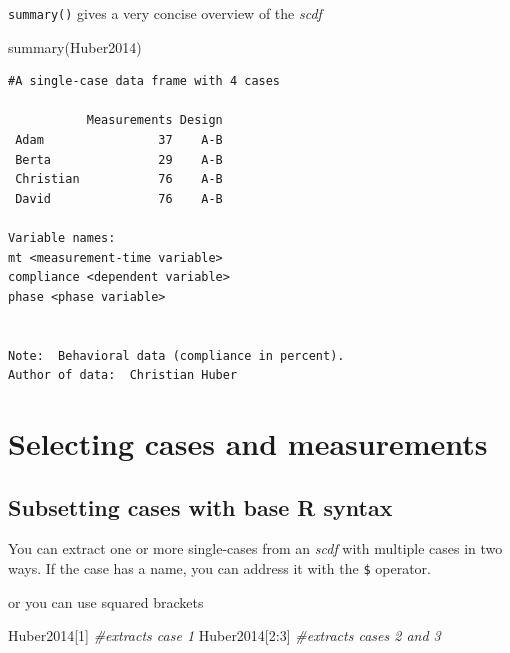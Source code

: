 \documentclass[
]{book}
\newenvironment{Shaded}{\begin{snugshade}}{\end{snugshade}}
\newcommand{\CommentTok}[1]{\textcolor[rgb]{0.56,0.35,0.01}{\textit{#1}}}
\newcommand{\DecValTok}[1]{\textcolor[rgb]{0.00,0.00,0.81}{#1}}
\newcommand{\FunctionTok}[1]{\textcolor[rgb]{0.00,0.00,0.00}{#1}}
\newcommand{\NormalTok}[1]{#1}
\newcommand{\SpecialCharTok}[1]{\textcolor[rgb]{0.00,0.00,0.00}{#1}}
\begin{document}
\texttt{summary()} gives a very concise overview of the \emph{scdf}

\begin{Shaded}
\begin{Highlighting}[]
\FunctionTok{summary}\NormalTok{(Huber2014)}
\end{Highlighting}
\end{Shaded}

\begin{verbatim}
#A single-case data frame with 4 cases

           Measurements Design
 Adam                37    A-B
 Berta               29    A-B
 Christian           76    A-B
 David               76    A-B

Variable names:
mt <measurement-time variable>
compliance <dependent variable>
phase <phase variable>


Note:  Behavioral data (compliance in percent).
Author of data:  Christian Huber 
\end{verbatim}

\hypertarget{selecting-cases-and-measurements}{%
\section{Selecting cases and measurements}\label{selecting-cases-and-measurements}}

\hypertarget{subsetting-cases-with-base-r-syntax}{%
\subsection{Subsetting cases with base R syntax}\label{subsetting-cases-with-base-r-syntax}}

You can extract one or more single-cases from an \emph{scdf} with multiple cases in two ways. If the case has a name, you can address it with the \texttt{\$} operator.

\begin{Shaded}
\end{Shaded}

or you can use squared brackets

\begin{Shaded}
\begin{Highlighting}[]
\NormalTok{Huber2014[}\DecValTok{1}\NormalTok{] }\CommentTok{\#extracts case 1}
\NormalTok{Huber2014[}\DecValTok{2}\SpecialCharTok{:}\DecValTok{3}\NormalTok{] }\CommentTok{\#extracts cases 2 and 3}
\end{Highlighting}
\end{Shaded}
\end{document}
